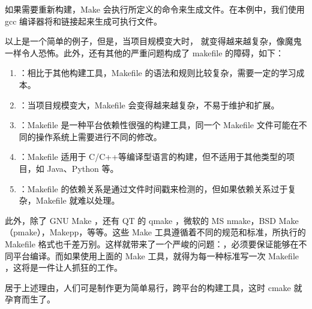 \documentclass[a4paper,12pt,english]{sphinxmanual}
\begin{document}
\sphinxAtStartPar
如果需要重新构建，Make 会执行所定义的命令来生成文件。在本例中，我们使用 gcc 编译器将和链接起来生成可执行文件。

\sphinxAtStartPar
以上是一个简单的例子，但是，当项目规模变大时， 就变得越来越复杂，像魔鬼一样令人恐怖。此外，还有其他的严重问题构成了 makefile 的障碍，如下：
\begin{enumerate}
%
\item {} 
\sphinxAtStartPar
{}：相比于其他构建工具，Makefile 的语法和规则比较复杂，需要一定的学习成本。

\item {} 
\sphinxAtStartPar
{}：当项目规模变大，Makefile 会变得越来越复杂，不易于维护和扩展。

\item {} 
\sphinxAtStartPar
{}：Makefile 是一种平台依赖性很强的构建工具，同一个 Makefile 文件可能在不同的操作系统上需要进行不同的修改。

\item {} 
\sphinxAtStartPar
{}：Makefile 适用于 C/C++等编译型语言的构建，但不适用于其他类型的项目，如 Java、Python 等。

\item {} 
\sphinxAtStartPar
{}：Makefile 的依赖关系是通过文件时间戳来检测的，但如果依赖关系过于复杂，Makefile 就难以处理。

\end{enumerate}

\sphinxAtStartPar
此外，除了 GNU Make ，还有 QT 的 qmake ，微软的 MS nmake，BSD Make（pmake），Makepp，等等。这些 Make 工具遵循着不同的规范和标准，所执行的 Makefile 格式也千差万别。这样就带来了一个严峻的问题：，必须要保证能够在不同平台编译。而如果使用上面的 Make 工具，就得为每一种标准写一次 Makefile ，这将是一件让人抓狂的工作。

\sphinxAtStartPar
居于上述理由，人们可是制作更为简单易行，跨平台的构建工具，这时 cmake 就孕育而生了。
\end{document}

